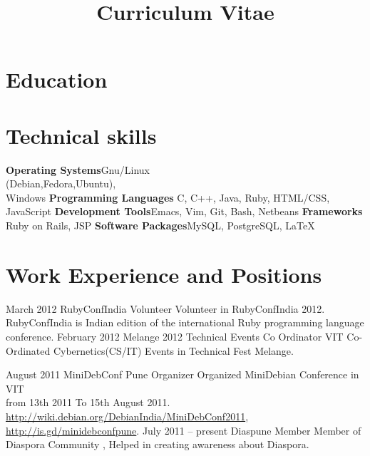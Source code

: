 \documentclass[11pt,a4paper]{moderncv}
\title{Curriculum Vitae}
\begin{document}
\maketitle

\section{Education}

\section{Technical skills}
\cvcomputer
{\textbf{Operating Systems}}{Gnu/Linux
\\(Debian,Fedora,Ubuntu), \\Windows}
{\textbf{Programming Languages}}{ C, C++, Java, Ruby, HTML/CSS, JavaScript }
\cvcomputer
{\textbf{Development Tools}}{Emacs, Vim, Git, Bash, Netbeans}
{\textbf{Frameworks}}{ Ruby on Rails, JSP}
\cvcomputer
{\textbf{Software Packages}}{MySQL, PostgreSQL, LaTeX}
{}{}


\section{Work Experience and Positions}

\cventry    
            {March 2012}
            {RubyConfIndia}
            {Volunteer}
            {}
            {}
            {
              Volunteer in RubyConfIndia 2012. \\ 
              RubyConfIndia is Indian edition of the international
              Ruby programming language conference. 
            }
\cventry
            {February 2012}
            {Melange 2012 Technical Events }
            {Co Ordinator}
            {VIT}
            {}
            {
             Co-Ordinated Cybernetics(CS/IT) Events in Technical Fest
             Melange.
            } 

\cventry
            {August 2011}
            {MiniDebConf Pune}
            {Organizer}
            {}
            {}
            {
             Organized MiniDebian Conference in VIT \\
             from 13th 2011 To 15th August 2011.    \\
             \url{http://wiki.debian.org/DebianIndia/MiniDebConf2011}, \\
             \url{http://is.gd/minidebconfpune}.
           }
\cventry
           {July 2011 -- present}
           {Diaspune}
           {Member}
           {}
           {}
           {
            Member of Diaspora Community , Helped in creating
            awareness about Diaspora. 
           }\\\\\\\\\\
\end{document}
